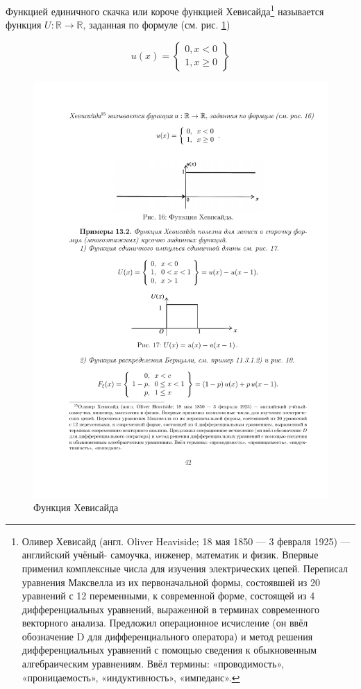 \begin{theorem}
\label{th:13.1}
	Функцией единичного скачка или короче функцией
Хевисайда\footnote{Оливер Хевисайд (англ. Oliver Heaviside; 18 мая 1850 — 3 февраля 1925) — английский учёный-
самоучка, инженер, математик и физик. Впервые применил комплексные числа для изучения электрических цепей. Переписал уравнения Максвелла из их первоначальной формы, состоявшей из 20 уравнений
с 12 переменными, к современной форме, состоящей из 4 дифференциальных уравнений, выраженной в
терминах современного векторного анализа. Предложил операционное исчисление (он ввёл обозначение D
для дифференциального оператора) и метод решения дифференциальных уравнений с помощью сведения
к обыкновенным алгебраическим уравнениям. Ввёл термины: «проводимость», «проницаемость», «индуктивность», «импеданс».} называется функция $U : \mathbb{R}\rightarrow \mathbb{R}$, заданная по формуле (см. рис. \ref{fig16})

\begin{equation*}
u(x) = 
 \left\{\begin{aligned}
   0,x<0\\
   1,x\geqslant 0 
 \end{aligned}\right\}
\end{equation*}
\end{theorem}

\begin{figure}[H]
	\centering
	\includegraphics[]{pic/pic16}
	\caption{Функция Хевисайда}
	\label{fig16}
\end{figure}

